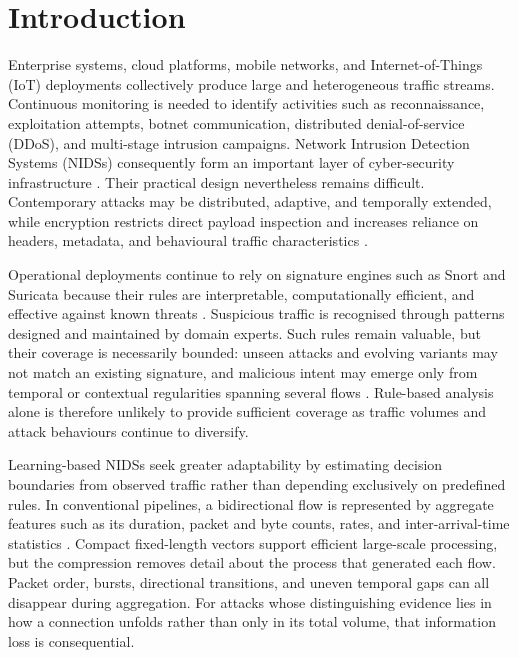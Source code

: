 \documentclass[11pt,fleqn]{report}
\begin{document}
\chapter{Introduction}
\label{sec:introduction}

Enterprise systems, cloud platforms, mobile networks, and Internet-of-Things (IoT) deployments collectively produce large and heterogeneous traffic streams. Continuous monitoring is needed to identify activities such as reconnaissance, exploitation attempts, botnet communication, distributed denial-of-service (DDoS), and multi-stage intrusion campaigns. Network Intrusion Detection Systems (NIDSs) consequently form an important layer of cyber-security infrastructure \cite{Roesch1999,SommerPaxson2010}. Their practical design nevertheless remains difficult. Contemporary attacks may be distributed, adaptive, and temporally extended, while encryption restricts direct payload inspection and increases reliance on headers, metadata, and behavioural traffic characteristics \cite{Sharma2025EncryptedSurvey,Dong2025EncryptedPretrain}.

Operational deployments continue to rely on signature engines such as Snort and Suricata because their rules are interpretable, computationally efficient, and effective against known threats \cite{Roesch1999,SuricataGuide2026}. Suspicious traffic is recognised through patterns designed and maintained by domain experts. Such rules remain valuable, but their coverage is necessarily bounded: unseen attacks and evolving variants may not match an existing signature, and malicious intent may emerge only from temporal or contextual regularities spanning several flows \cite{SommerPaxson2010,Hozouri2025Survey}. Rule-based analysis alone is therefore unlikely to provide sufficient coverage as traffic volumes and attack behaviours continue to diversify.

Learning-based NIDSs seek greater adaptability by estimating decision boundaries from observed traffic rather than depending exclusively on predefined rules. In conventional pipelines, a bidirectional flow is represented by aggregate features such as its duration, packet and byte counts, rates, and inter-arrival-time statistics \cite{BuczakGuven2016,Ahmed2016Survey}. Compact fixed-length vectors support efficient large-scale processing, but the compression removes detail about the process that generated each flow. Packet order, bursts, directional transitions, and uneven temporal gaps can all disappear during aggregation. For attacks whose distinguishing evidence lies in how a connection unfolds rather than only in its total volume, that information loss is consequential.
\end{document}

